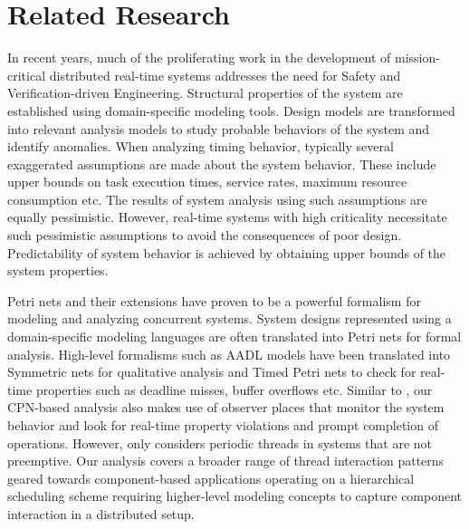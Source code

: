 \vspace{-0.05in}

\section{Related Research}
\label{sec:Related_Research}

In recent years, much of the proliferating work in the development of mission-critical distributed real-time systems addresses the need for Safety and Verification-driven Engineering. Structural properties of the system are established using domain-specific modeling tools. Design models are transformed into relevant analysis models to study probable behaviors of the system and identify anomalies. When analyzing timing behavior, typically several exaggerated assumptions are made about the system behavior. These include upper bounds on task execution times, service rates, maximum resource consumption etc. The results of system analysis using such assumptions are equally pessimistic. However, real-time systems with high criticality necessitate such pessimistic assumptions to avoid the consequences of poor design. Predictability of system behavior is achieved by obtaining upper bounds of the system properties.   

Petri nets and their extensions have proven to be a powerful formalism for modeling and analyzing concurrent systems. System designs represented using a domain-specific modeling languages are often translated into Petri nets for formal analysis. High-level formalisms such as AADL models have been translated into Symmetric nets for qualitative analysis \cite{kordon_sn} and Timed Petri nets \cite{kordon2009} to check for real-time properties such as deadline misses, buffer overflows etc. Similar to \cite{kordon2009}, our CPN-based analysis also makes use of observer places \cite{Alpern1989} that monitor the system behavior and look for real-time property violations and prompt completion of operations. However, \cite{kordon2009} only considers periodic threads in systems that are not preemptive. Our analysis covers a broader range of thread interaction patterns geared towards component-based applications operating on a hierarchical scheduling scheme requiring higher-level modeling concepts to capture component interaction in a distributed setup. 


